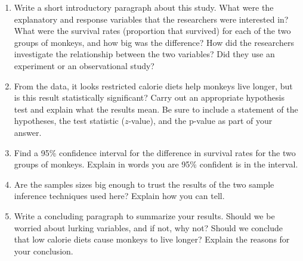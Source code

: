 \documentclass[12pt]{article}
\begin{document}
\begin{enumerate}


\item Write a short introductory paragraph about this study.  What were the explanatory and response variables that the researchers were interested in?  What were the survival rates (proportion that survived) for each of the two groups of monkeys, and how big was the difference? How did the researchers investigate the relationship between the two variables?  Did they use an experiment or an observational study? 


\item From the data, it looks restricted calorie diets help monkeys live longer, but is this result statistically significant? Carry out an appropriate hypothesis test and explain what the results mean.  Be sure to include a statement of the hypotheses, the test statistic ($z$-value), and the p-value as part of your answer.  

\item Find a 95\% confidence interval for the difference in survival rates for the two groups of monkeys. Explain in words you are 95\% confident is in the interval. 

\item Are the samples sizes big enough to trust the results of the two sample inference techniques used here?  Explain how you can tell.  


\item Write a concluding paragraph to summarize your results. Should we be worried about lurking variables, and if not, why not?  Should we conclude that low calorie diets cause monkeys to live longer? Explain the reasons for your conclusion.
\end{enumerate}
\end{document}
